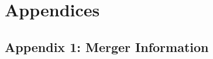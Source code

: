 \documentclass[11pt, english]{article}
\begin{document}
\newpage

%
%
%
%
%
%
%

%
%
%
%
%
%

\section*{Appendices}

	\subsection*{Appendix 1: Merger Information}
\end{document}
